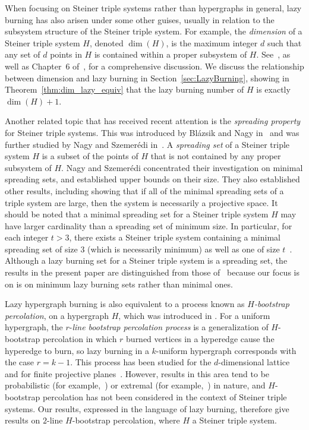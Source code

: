 \documentclass[12pt]{article}
\theoremstyle{definition}
\numberwithin{table}{section}
\begin{document}
When focusing on Steiner triple systems rather than hypergraphs in general, lazy burning has also arisen under some other guises, usually in relation to the subsystem structure of the Steiner triple system. 
For example, the \emph{dimension} of a Steiner triple system $H$, denoted $\dim(H)$, is the maximum integer $d$ such that any set of $d$ points in $H$ is contained within a proper subsystem of $H$. 
See~\cite{Valle_Dukes, HiltonTeirlinck1980}, as well as Chapter~6 of~\cite{ triple_systems_text}, for a comprehensive discussion.
We discuss the relationship between dimension and lazy burning in Section~\ref{sec:LazyBurning}, showing in Theorem~\ref{thm:dim_lazy_equiv} that the lazy burning number of $H$ is exactly $\dim(H)+1$.

Another related topic that has received recent attention is the {\em spreading property} for Steiner triple systems. 
This was introduced by Bl\'{a}zsik and Nagy in~\cite{BlazsikNagy} and was further studied by Nagy and Szemer\'{e}di in~\cite{NagySzemeredi}.  
A \emph{spreading set} of a Steiner triple system $H$ is a subset of the points of $H$ that is not contained by any proper subsystem of $H$.
Nagy and Szemer\'{e}di concentrated their investigation on minimal spreading sets, and established upper bounds on their size.
They also established other results, including showing that if all of the minimal spreading sets of a triple system are large, then the system is necessarily a projective space.
It should be noted that a minimal spreading set for a Steiner triple system $H$ may have larger cardinality than a spreading set of minimum size.  In particular, for each integer $t>3$, there exists a Steiner triple system containing a minimal spreading set of size $3$ (which is necessarily minimum) as well as one of size $t$~\cite{NagySzemeredi}.
Although a lazy burning set for a Steiner triple system is a spreading set, 
the results in the present paper are distinguished from those of~\cite{BlazsikNagy,NagySzemeredi} because our focus is on is on minimum lazy burning sets rather than minimal ones.  

Lazy hypergraph burning is also equivalent to a process known as $H$\emph{-bootstrap percolation}, on a hypergraph $H$, which was introduced in \cite{bootstrap_paper_1}. 
For a uniform hypergraph, the $r$-\emph{line bootstrap percolation process} is a generalization of $H$-bootstrap percolation in which $r$ burned vertices in a hyperedge cause the hyperedge to burn, so lazy burning in a $k$-uniform hypergraph corresponds with the case $r=k-1$. This process has been studied for the $d$-dimensional lattice~\cite{LinePercolation} and for finite projective planes~\cite{percolation_planes}. 
However, results in this area tend to be probabilistic (for example,~\cite{MorrisonNoel2021}) or extremal (for example,~\cite{MorrisonNoel2018}) in nature, and $H$-bootstrap percolation has not been considered in the context of Steiner triple systems. 
Our results, expressed in the language of lazy burning, therefore give results on $2$-line $H$-bootstrap percolation, where $H$ a Steiner triple system.
\end{document}
